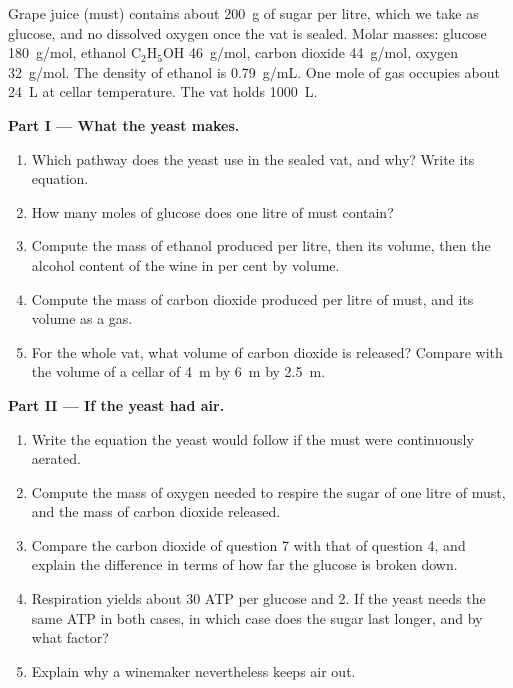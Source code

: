 \begin{problem}
\label{pb:g10:cell-metabolism:1}
Grape juice (must) contains about \qty{200}{g} of sugar per litre,
which we take as glucose, and no dissolved oxygen once the vat is
sealed. Molar masses: glucose \qty{180}{g/mol}, ethanol
$\mathrm{C_2H_5OH}$ \qty{46}{g/mol}, carbon dioxide \qty{44}{g/mol},
oxygen \qty{32}{g/mol}. The density of ethanol is \qty{0.79}{g/mL}.
One mole of gas occupies about \qty{24}{L} at cellar temperature. The
vat holds \qty{1000}{L}.

\medskip
\noindent\textbf{Part I --- What the yeast makes.}
\begin{enumerate}
  \item Which pathway does the yeast use in the sealed vat, and why?
        Write its equation.
  \item How many moles of glucose does one litre of must contain?
  \item Compute the mass of ethanol produced per litre, then its
        volume, then the alcohol content of the wine in per cent by
        volume.
  \item Compute the mass of carbon dioxide produced per litre of must,
        and its volume as a gas.
  \item For the whole vat, what volume of carbon dioxide is released?
        Compare with the volume of a cellar of \qty{4}{m} by \qty{6}{m}
        by \qty{2.5}{m}.
\end{enumerate}

\medskip
\noindent\textbf{Part II --- If the yeast had air.}
\begin{enumerate}[resume]
  \item Write the equation the yeast would follow if the must were
        continuously aerated.
  \item Compute the mass of oxygen needed to respire the sugar of one
        litre of must, and the mass of carbon dioxide released.
  \item Compare the carbon dioxide of question 7 with that of
        question 4, and explain the difference in terms of how far the
        glucose is broken down.
  \item Respiration yields about 30 ATP per glucose and 
        2. If the yeast needs the same ATP in both cases, in which case
        does the sugar last longer, and by what factor?
  \item Explain why a winemaker nevertheless keeps air out.
\end{enumerate}


\end{problem}
